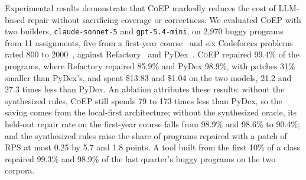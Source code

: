 \documentclass[acmsmall,screen,review,anonymous,nonacm]{acmart}
\newcommand{\tool}{\textsc{CoEP}\xspace}
\newcommand{\cs}{\texttt{claude-sonnet-5}\xspace}
\newcommand{\gm}{\texttt{gpt-5.4-mini}\xspace}
\begin{document}
Experimental results demonstrate that \tool markedly reduces the cost of LLM-based repair without sacrificing coverage or correctness. We evaluated \tool with two builders, \cs and \gm, on 2{,}970 buggy programs from 11 assignments, five from a first-year course~\cite{hu2019re} and six Codeforces problems rated 800 to 2000~\cite{penedo2025codeforces}, against Refactory~\cite{hu2019re} and PyDex~\cite{zhang2024pydex}. \tool repaired 99.4\% of the programs, where Refactory repaired 85.9\% and PyDex 98.9\%, with patches 31\% smaller than PyDex's, and spent \$13.83 and \$1.04 on the two models, 21.2 and 27.3 times less than PyDex. An ablation attributes these results: without the synthesized rules, \tool still spends 79 to 173 times less than PyDex, so the saving comes from the local-first architecture; without the synthesized oracle, its held-out repair rate on the first-year course falls from 98.9\% and 98.6\% to 90.4\%; and the synthesized rules raise the share of programs repaired with a patch of RPS at most 0.25 by 5.7 and 1.8 points. A tool built from the first 10\% of a class repaired 99.3\% and 98.9\% of the last quarter's buggy programs on the two corpora.
\end{document}
